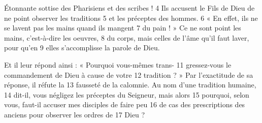 Étonnante sottise des Pharisiens et des scribes !	 
4	 	Ils accusent le Fils de Dieu de ne point observer les traditions	 
5	 	et les préceptes des hommes.	 
6	 	« En effet, ils ne se lavent pas les mains quand ils mangent	 
7	 	du pain ! » Ce ne sont point les mains, c'est-à-dire les oeuvres,	 
8	 	du corps, mais celles de l'âme qu'il faut laver, pour qu'en	 
9	 	elles s'accomplisse la parole de Dieu.

Et il leur répond ainsi : « Pourquoi vous-mêmes trans-	 
11	 	gressez-vous le commandement de Dieu à cause de votre	 
12	 	tradition ? » Par l'exactitude de sa réponse, il réfute la	 
13	 	fausseté de la calomnie. Au nom d'une tradition humaine,	 
14	 	dit-il, vous négligez les préceptes du Seigneur, mais alors	 
15	 	pourquoi, selon vous, faut-il accuser mes disciples de faire peu	 
16	 	de cas des prescriptions des anciens pour observer les ordres de	 
17	 	Dieu ?